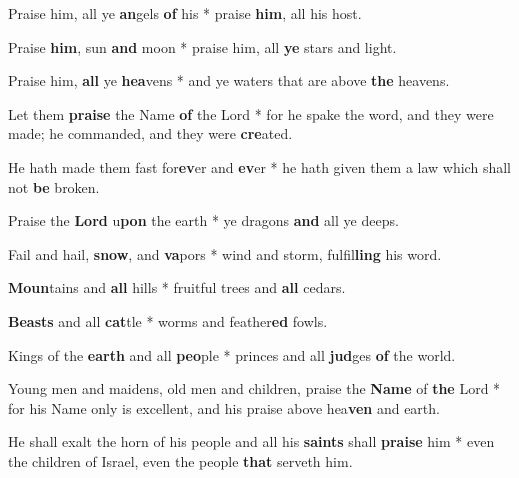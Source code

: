 \begin{multicols}{2}
	Praise him, all ye \textbf{an}gels \textbf{of} his * praise \textbf{him}, all his host.
	
	Praise \textbf{him}, sun \textbf{and} moon * praise him, all \textbf{ye} stars and light.
	
	Praise him, \textbf{all} ye \textbf{hea}vens * and ye waters that are above \textbf{the} heavens.
	
	Let them \textbf{praise} the Name \textbf{of} the Lord * for he spake the word, and they were made; he commanded, and they were \textbf{cre}ated.
	
	He hath made them fast for\textbf{ev}er and \textbf{ev}er * he hath given them a law which shall not \textbf{be} broken.
	
	Praise the \textbf{Lord} u\textbf{pon} the earth * ye dragons \textbf{and} all ye deeps.
	
	Fail and hail, \textbf{snow}, and \textbf{va}pors * wind and storm, fulfil\textbf{ling} his word.
	
	\textbf{Moun}tains and \textbf{all} hills * fruitful trees and \textbf{all} cedars.
	
	\textbf{Beasts} and all \textbf{cat}tle * worms and feather\textbf{ed} fowls.
	
	Kings of the \textbf{earth} and all \textbf{peo}ple * princes and all \textbf{jud}ges \textbf{of} the world.
	
	Young men and maidens, old men and children, praise the \textbf{Name} of \textbf{the} Lord * for his Name only is excellent, and his praise above hea\textbf{ven} and earth.
	
	He shall exalt the horn of his people and all his \textbf{saints} shall \textbf{praise} him * even the children of Israel, even the people \textbf{that} serveth him.
\end{multicols}
